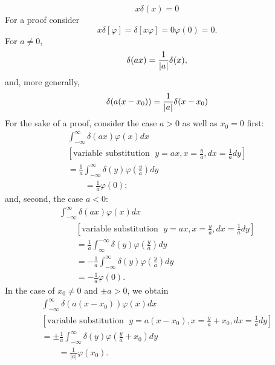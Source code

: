  \begin{equation}
 x\delta (x)=0
 \end{equation}
{\color{OliveGreen}
\bproof
For a proof consider
 \begin{equation}
x \delta
[\varphi ]
=
\delta
\left[  x  \varphi \right]
=
0\varphi(0) = 0.
 \end{equation}
\eproof
}
For $a\neq 0$,
 \begin{equation}
 \delta (ax)={1\over \vert a\vert }\delta (x),
\label{2011-m-distdp}
 \end{equation}
and, more generally,
 \begin{equation}
 \delta (a(x-x_0))={1\over \vert a\vert }\delta (x-x_0)
\label{2011-m-distdpmg}
 \end{equation}
{\color{OliveGreen}
\bproof
For the sake of a proof,  consider the case $a>0$ as well as $x_0=0$ first:
 \begin{equation}
 \begin{split}
\int _{-\infty}^\infty \delta (ax)  \varphi (x)  dx
\\
  [\textrm{variable substitution }\; y = ax, x=\frac{y}{a}, dx=\frac{1}{a} dy]\\
  =
\frac{1}{a}\int _{-\infty}^\infty \delta (y)  \varphi\left (\frac{y}{a}\right) dy  \\
\qquad =    \frac{1}{a}  \varphi (0);
 \end{split}
 \end{equation}
and, second, the case $a<0$:
 \begin{equation}
 \begin{split}
\int _{-\infty}^\infty \delta (ax)  \varphi (x)  dx     \\
\qquad [\textrm{variable substitution }\; y = ax, x=\frac{y}{a}, dx=\frac{1}{a} dy]\\
\qquad =
\frac{1}{a}\int _\infty^{-\infty} \delta (y)  \varphi\left (\frac{y}{a}\right) dy \\
\qquad =
- \frac{1}{a}\int _{-\infty}^\infty \delta (y)  \varphi\left (\frac{y}{a}\right) dy       \\
\qquad =   - \frac{1}{a}  \varphi (0).
 \end{split}
 \end{equation}
In the case of $x_0\neq 0$ and $\pm a>0$, we obtain
\begin{equation}
 \begin{split}
\int _{-\infty}^\infty \delta (a(x-x_0))  \varphi (x)  dx
\\
 [\textrm{variable substitution }\; y = a(x-x_0), x=\frac{y}{a}+x_0, dx=\frac{1}{a} dy]\\
 =
\pm \frac{1}{a}\int _{-\infty}^\infty \delta (y)  \varphi \left(\frac{y}{a}+x_0\right) dy  \\
\qquad =    \frac{1}{|a|}  \varphi (x_0).
 \end{split}
 \end{equation}
\eproof
}

